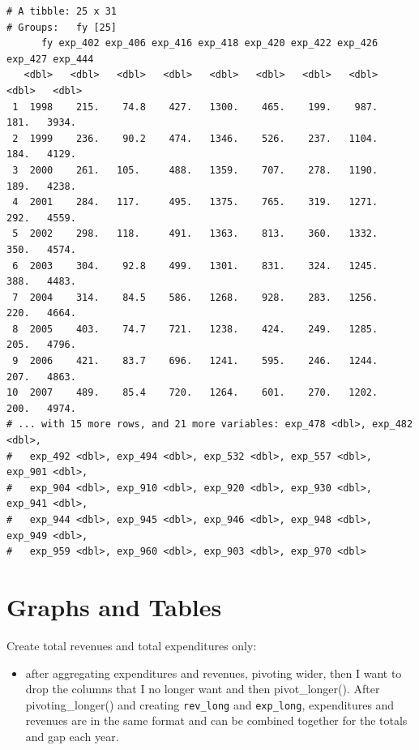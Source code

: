 \documentclass[
  letterpaper,
  DIV=11,
  numbers=noendperiod]{scrreport}
\providecommand{\tightlist}{%
  \setlength{\itemsep}{0pt}\setlength{\parskip}{0pt}}\usepackage{longtable,booktabs,array}
\begin{document}
\begin{verbatim}
# A tibble: 25 x 31
# Groups:   fy [25]
      fy exp_402 exp_406 exp_416 exp_418 exp_420 exp_422 exp_426 exp_427 exp_444
   <dbl>   <dbl>   <dbl>   <dbl>   <dbl>   <dbl>   <dbl>   <dbl>   <dbl>   <dbl>
 1  1998    215.    74.8    427.   1300.    465.    199.    987.    181.   3934.
 2  1999    236.    90.2    474.   1346.    526.    237.   1104.    184.   4129.
 3  2000    261.   105.     488.   1359.    707.    278.   1190.    189.   4238.
 4  2001    284.   117.     495.   1375.    765.    319.   1271.    292.   4559.
 5  2002    298.   118.     491.   1363.    813.    360.   1332.    350.   4574.
 6  2003    304.    92.8    499.   1301.    831.    324.   1245.    388.   4483.
 7  2004    314.    84.5    586.   1268.    928.    283.   1256.    220.   4664.
 8  2005    403.    74.7    721.   1238.    424.    249.   1285.    205.   4796.
 9  2006    421.    83.7    696.   1241.    595.    246.   1244.    207.   4863.
10  2007    489.    85.4    720.   1264.    601.    270.   1202.    200.   4974.
# ... with 15 more rows, and 21 more variables: exp_478 <dbl>, exp_482 <dbl>,
#   exp_492 <dbl>, exp_494 <dbl>, exp_532 <dbl>, exp_557 <dbl>, exp_901 <dbl>,
#   exp_904 <dbl>, exp_910 <dbl>, exp_920 <dbl>, exp_930 <dbl>, exp_941 <dbl>,
#   exp_944 <dbl>, exp_945 <dbl>, exp_946 <dbl>, exp_948 <dbl>, exp_949 <dbl>,
#   exp_959 <dbl>, exp_960 <dbl>, exp_903 <dbl>, exp_970 <dbl>
\end{verbatim}


\hypertarget{graphs-and-tables}{%
\chapter{Graphs and Tables}\label{graphs-and-tables}}

Create total revenues and total expenditures only:

\begin{itemize}
\tightlist
\item
  after aggregating expenditures and revenues, pivoting wider, then I
  want to drop the columns that I no longer want and then
  pivot\_longer(). After pivoting\_longer() and creating
  \texttt{rev\_long} and \texttt{exp\_long}, expenditures and revenues
  are in the same format and can be combined together for the totals and
  gap each year.
\end{itemize}
\end{document}
